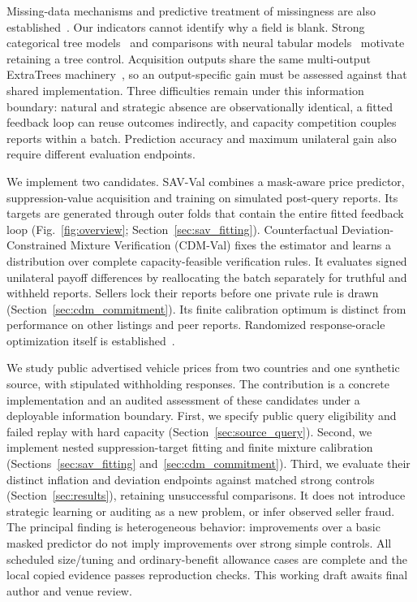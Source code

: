 Missing-data mechanisms and predictive treatment of missingness are also
established~\cite{rubin1976missing,lemorvan2021imputation,lemorvan2020neumiss}.
Our indicators cannot identify why a field is blank. Strong categorical
tree models~\cite{prokhorenkova2018catboost} and comparisons with neural tabular
models~\cite{gorishniy2021tabular} motivate retaining a tree control. Acquisition
outputs share the same multi-output ExtraTrees machinery~\cite{geurts2006extratrees},
so an output-specific gain must be assessed against that shared implementation.
Three difficulties remain under this information boundary: natural and
strategic absence are observationally identical, a fitted feedback loop can
reuse outcomes indirectly, and capacity competition couples reports within
a batch. Prediction accuracy and maximum unilateral gain also require
different evaluation endpoints.

We implement two candidates. SAV-Val combines a mask-aware price predictor,
suppression-value acquisition and training on simulated post-query reports.
Its targets are generated through outer folds that contain the entire fitted
feedback loop (Fig.~\ref{fig:overview}; Section~\ref{sec:sav_fitting}).
Counterfactual Deviation-Constrained Mixture Verification (CDM-Val) fixes
the estimator and learns
a distribution over complete capacity-feasible verification rules. It evaluates
signed unilateral payoff differences by reallocating the batch separately for
truthful and withheld reports. Sellers lock their reports before one private
rule is drawn (Section~\ref{sec:cdm_commitment}). Its finite calibration optimum
is distinct from performance on
other listings and peer reports. Randomized response-oracle optimization itself
is established~\cite{jain2011doubleoracle}.

We study public advertised vehicle prices from two countries and one synthetic
source, with stipulated withholding responses. The contribution is a concrete
implementation and an audited assessment of these candidates under a deployable
information boundary. First, we specify public query eligibility and failed
replay with hard capacity (Section~\ref{sec:source_query}). Second, we implement
nested suppression-target fitting and finite mixture calibration
(Sections~\ref{sec:sav_fitting} and~\ref{sec:cdm_commitment}). Third, we evaluate
their distinct inflation and deviation endpoints against matched strong
controls (Section~\ref{sec:results}), retaining unsuccessful comparisons.
It does not introduce strategic learning or auditing as a new
problem, or infer observed seller fraud. The principal finding is heterogeneous
behavior: improvements over a basic masked predictor do not imply improvements
over strong simple controls. All scheduled size/tuning and ordinary-benefit
allowance cases are complete and the local copied evidence passes
reproduction checks. This working draft awaits final author and venue review.

